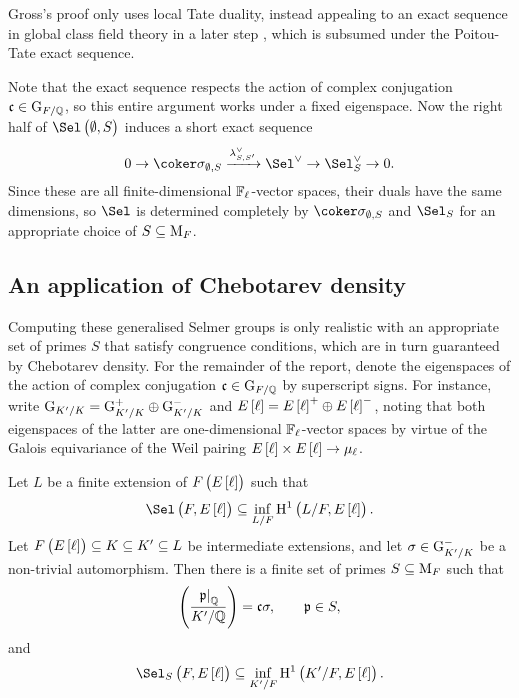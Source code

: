 \begin{remark}
Gross's proof only uses local Tate duality, instead appealing to an exact sequence in global class field theory in a later step \cite[Proposition 8.2]{Gro91}, which is subsumed under the Poitou-Tate exact sequence.
\end{remark}

Note that the exact sequence respects the action of complex conjugation $ \mathfrak{c} \in \mathrm{G}_{F / \mathbb{Q}} $, so this entire argument works under a fixed eigenspace. Now the right half of $ \Sel\br{\emptyset, S} $ induces a short exact sequence
$$ 0 \to \coker \sigma_{\emptyset, S} \xrightarrow{\lambda_{S, S'}^\vee} \Sel^\vee \to \Sel_S^\vee \to 0. $$
Since these are all finite-dimensional $ \mathbb{F}_\ell $-vector spaces, their duals have the same dimensions, so $ \Sel $ is determined completely by $ \coker \sigma_{\emptyset, S} $ and $ \Sel_S $ for an appropriate choice of $ S \subseteq \mathrm{M}_F $.

\pagebreak

\subsection{An application of Chebotarev density}

Computing these generalised Selmer groups is only realistic with an appropriate set of primes $ S $ that satisfy congruence conditions, which are in turn guaranteed by Chebotarev density. For the remainder of the report, denote the eigenspaces of the action of complex conjugation $ \mathfrak{c} \in \mathrm{G}_{F / \mathbb{Q}} $ by superscript signs. For instance, write $ \mathrm{G}_{K' / K} = \mathrm{G}_{K' / K}^+ \oplus \mathrm{G}_{K' / K}^- $ and $ E\sbr{\ell} = E\sbr{\ell}^+ \oplus E\sbr{\ell}^- $, noting that both eigenspaces of the latter are one-dimensional $ \mathbb{F}_\ell $-vector spaces by virtue of the Galois equivariance of the Weil pairing $ E\sbr{\ell} \times E\sbr{\ell} \to \mu_\ell $.

\begin{lemma}
\label{lem:chebotarevdensity}
Let $ L $ be a finite extension of $ F\br{E\sbr{\ell}} $ such that
$$ \Sel\br{F, E\sbr{\ell}} \subseteq \inf_{L / F} \H^1\br{L / F, E\sbr{\ell}}. $$
Let $ F\br{E\sbr{\ell}} \subseteq K \subseteq K' \subseteq L $ be intermediate extensions, and let $ \sigma \in \mathrm{G}_{K' / K}^- $ be a non-trivial automorphism. Then there is a finite set of primes $ S \subseteq \mathrm{M}_F $ such that
$$ \br{\dfrac{\eval{\ppp}_{\QQ}}{K' / \QQ}} = \ccc\sigma, \qquad \ppp \in S, $$
and
$$ \Sel_S\br{F, E\sbr{\ell}} \subseteq \inf_{K' / F} \H^1\br{K' / F, E\sbr{\ell}}. $$
\end{lemma}

